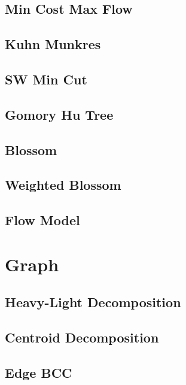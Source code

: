 \subsection{Min Cost Max Flow}

\subsection{Kuhn Munkres}
\subsection{SW Min Cut}
\subsection{Gomory Hu Tree}
\subsection{Blossom}
\subsection{Weighted Blossom}
\subsection{Flow Model}


\section{Graph}
\subsection{Heavy-Light Decomposition}

\subsection{Centroid Decomposition}

\subsection{Edge BCC}
